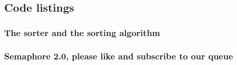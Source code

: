 \documentclass[11pt]{article}
\begin{document}
\subsection*{Code listings}




\subsubsection*{The sorter and the sorting algorithm}



\subsubsection*{Semaphore 2.0, please like and subscribe to our queue}










\end{document}
